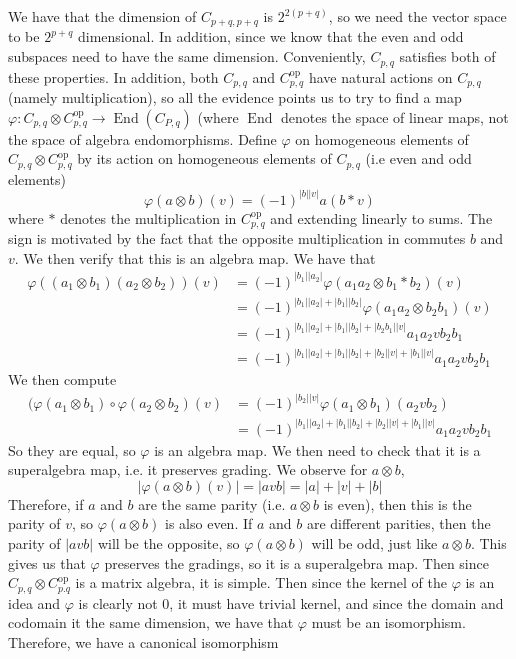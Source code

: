 \documentclass[psamsfonts]{amsart}
\theoremstyle{definition}
\theoremstyle{remark}
\DeclareMathOperator{\End}{End}
\begin{document}
We have that the dimension of $C_{p+q, p+q}$ is $2^{2(p+q)}$, so we need the vector space to be $2^{p+q}$ dimensional. In addition, since we know that the even and odd subspaces need to have the same dimension. Conveniently, $C_{p,q}$ satisfies both of these properties. In addition, both $C_{p,q}$ and $C_{p,q}^\text{op}$ have natural actions on $C_{p,q}$ (namely multiplication), so all the evidence points us to try to find a map $\varphi: C_{p,q} \otimes C_{p,q}^\text{op} \to \End(C_{P,q})$ (where $\End$ denotes the space of linear maps, not the space of algebra endomorphisms. Define $\varphi$ on homogeneous elements of $C_{p,q} \otimes C_{p,q}^\text{op}$ by its action on homogeneous elements of $C_{p,q}$ (i.e even and odd elements) 
$$\varphi(a \otimes b)(v) = (-1)^{|b||v|} a(b*v)$$
where $*$ denotes the multiplication in $C_{p,q}^\text{op}$ and extending linearly to sums. The sign is motivated by the fact that the opposite multiplication in commutes $b$ and $v$. We then verify that this is an algebra map. We have that 
\begin{align*}
\varphi((a_1\otimes b_1)(a_2 \otimes b_2))(v) &= (-1)^{|b_1||a_2|}\varphi(a_1a_2 \otimes b_1*b_2)(v) \\
&= (-1)^{|b_1||a_2| + |b_1||b_2|}\varphi(a_1a_2 \otimes b_2b_1)(v) \\
&= (-1)^{|b_1||a_2| +|b_1||b_2| + |b_2b_1||v|}a_1a_2vb_2b_1 \\
&= (-1)^{|b_1||a_2| + |b_1||b_2| + |b_2||v| + |b_1||v|} a_1a_2vb_2b_1
\end{align*}
We then compute
\begin{align*}
(\varphi(a_1 \otimes b_1) \circ \varphi(a_2 \otimes b_2)(v) &= (-1)^{|b_2||v|} \varphi(a_1 \otimes b_1)(a_2vb_2) \\
&= (-1)^{|b_1||a_2| + |b_1||b_2| + |b_2||v| + |b_1||v|} a_1a_2vb_2b_1
\end{align*}
So they are equal, so $\varphi$ is an algebra map. We then need to check that it is a superalgebra map, i.e. it preserves grading. We observe for $a \otimes b$, 
$$|\varphi(a\otimes b)(v)| = |avb| = |a| + |v| + |b| $$
Therefore, if $a$ and $b$ are the same parity (i.e. $a \otimes b$ is even), then this is the parity of $v$, so $\varphi(a \otimes b)$ is also even. If $a$ and $b$ are different parities, then the parity of $|avb|$ will be the opposite, so $\varphi(a \otimes b)$ will be odd, just like $a \otimes b$. This gives us that $\varphi$ preserves the gradings, so it is a superalgebra map. Then since $C_{p,q} \otimes C_{p.q}^\text{op}$ is a matrix algebra, it is simple. Then since the kernel of the $\varphi$ is an idea and $\varphi$ is clearly not $0$, it must have trivial kernel, and since the domain and codomain it the same dimension, we have that $\varphi$ must be an isomorphism. Therefore, we have a canonical isomorphism
\end{document}
